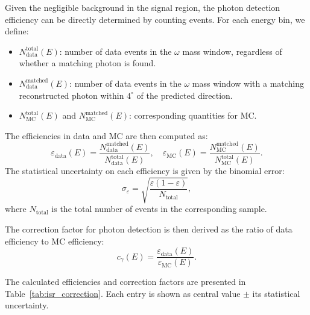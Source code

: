 Given the negligible background in the signal region, the photon detection efficiency can be directly determined by counting events. For each energy bin, we define:
\begin{itemize}
    \item $N_{\text{data}}^{\text{total}}(E)$: number of data events in the $\omega$ mass window, regardless of whether a matching photon is found.
    \item $N_{\text{data}}^{\text{matched}}(E)$: number of data events in the $\omega$ mass window with a matching reconstructed photon within $4^\circ$ of the predicted direction.
    \item $N_{\text{MC}}^{\text{total}}(E)$ and $N_{\text{MC}}^{\text{matched}}(E)$: corresponding quantities for MC.
\end{itemize}

The efficiencies in data and MC are then computed as:
\begin{equation}
    \varepsilon_{\text{data}}(E) = \frac{N_{\text{data}}^{\text{matched}}(E)}{N_{\text{data}}^{\text{total}}(E)}, \quad
    \varepsilon_{\text{MC}}(E) = \frac{N_{\text{MC}}^{\text{matched}}(E)}{N_{\text{MC}}^{\text{total}}(E)}.
    \label{eq:isr_efficiency}
\end{equation}
The statistical uncertainty on each efficiency is given by the binomial error:
\begin{equation}
    \sigma_{\varepsilon} = \sqrt{\frac{\varepsilon(1-\varepsilon)}{N_{\text{total}}}},
\end{equation}
where $N_{\text{total}}$ is the total number of events in the corresponding sample.

The correction factor for photon detection is then derived as the ratio of data efficiency to MC efficiency:
\begin{equation}
    c_{\gamma}(E) = \frac{\varepsilon_{\text{data}}(E)}{\varepsilon_{\text{MC}}(E)}.
    \label{eq:isr_correction}
\end{equation}

The calculated efficiencies and correction factors are presented in Table~\ref{tab:isr_correction}. Each entry is shown as central value $\pm$ its statistical uncertainty.

